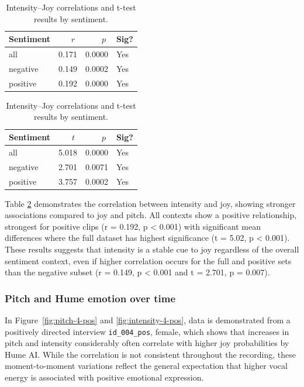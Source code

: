  \begin{table}[H]
    \centering
  
    \begin{subtable}{0.45\textwidth}
      \centering
      \caption{Intensity and Joy (r)}\label{tab:rq1_corr_intensity_joy}
      \begin{tabular}{l r r l}
        \toprule
        Sentiment & \(\;r\;\) & \(\;p\;\) & Sig? \\
        \midrule
        all      & 0.171 & 0.0000 & Yes \\
        negative & 0.149 & 0.0002 & Yes \\
        positive & 0.192 & 0.0000 & Yes \\
        \bottomrule
      \end{tabular}
    \end{subtable}\hfill
    \begin{subtable}{0.45\textwidth}
      \centering
      \caption{Intensity and Joy (t-test)}\label{tab:rq1_ttest_intensity_joy}
      \begin{tabular}{l r r l}
        \toprule
        Sentiment & \(\;t\;\) & \(\;p\;\) & Sig? \\
        \midrule
        all      & 5.018 & 0.0000 & Yes \\
        negative & 2.701 & 0.0071 & Yes \\
        positive & 3.757 & 0.0002 & Yes \\
        \bottomrule
      \end{tabular}
    \end{subtable}
  
    \caption{Intensity–Joy correlations and t-test results by sentiment.}
    \label{tab:rq1_intensity_joy_side_by_side}
  \end{table}
Table \ref{tab:rq1_intensity_joy_side_by_side} demonstrates the correlation between intensity and joy, showing stronger associations compared to joy and pitch. 
All contexts show a positive relationship, strongest for positive clips (r = 0.192, p < 0.001) with significant mean differences where the full dataset has highest significance (t = 5.02, p < 0.001). 
These results suggests that intensity is a stable cue to joy regardless of the overall sentiment context, even if higher correlation occurs for the full and positive sets than the negative subset (r = 0.149, p < 0.001 and t = 2.701, p = 0.007). 

\subsubsection{Pitch and Hume emotion over time}
In Figure~\ref{fig:pitch-4-pos} and \ref{fig:intensity-4-pos}, data is demonstrated from a positively directed interview \texttt{id\_004\_pos}, female, which shows that increases in pitch and intensity considerably often correlate with higher joy probabilities by Hume AI. While the correlation is not consistent throughout the recording, these moment-to-moment variations reflect the general expectation that higher vocal energy is associated with positive emotional expression. 

